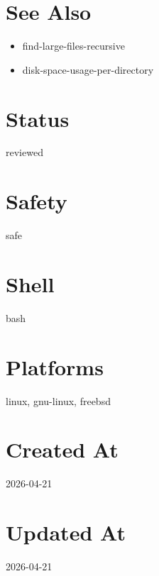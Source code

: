 \documentclass{article}
\begin{document}
\section*{See Also}
\begin{itemize}
  \item find-large-files-recursive
  \item disk-space-usage-per-directory
\end{itemize}

\section*{Status}
reviewed

\section*{Safety}
safe

\section*{Shell}
bash

\section*{Platforms}
linux, gnu-linux, freebsd

\section*{Created At}
2026-04-21

\section*{Updated At}
2026-04-21
\end{document}
